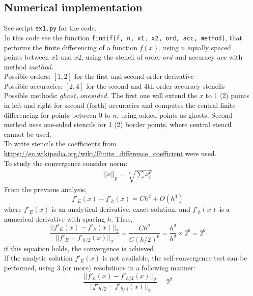 \documentclass{article}
\begin{document}
\subsection{Numerical implementation}
See script \texttt{ex1.py} for the code. \\
In this code see the function \texttt{findif(f, n, x1, x2, ord, acc, method)}, that performs the finite differencing of a function $f(x)$, using $n$ equally spaced points between $x1$ and $x2$, using the stencil of order $ord$ and accuracy $acc$ with method $method$. \\
Possible orders: $[1,2]$ for the first and second order derivative \\
Possible accuracies: $[2,4]$ for the second and 4th order accuracy stencils \\
Possible methods: $ghost$, $onesided$. The first one will extend the $x$ to 1 (2) points in left and right for second (forth) accuracies and computes the central finite differencing for points between $0$ to $n$, using added points as ghosts. Second method uses one-sided stencils for 1 (2) border points, where central stencil cannot be used. \\
To write stencils the coefficients from \url{https://en.wikipedia.org/wiki/Finite_difference_coefficient} were used. \\
%  
To study the convergence consider norm:
\begin{equation}
	\begin{aligned}
	||x||_p = \sqrt[p]{\sum x_i ^p} 
	\end{aligned}
\end{equation}
From the previous analysis, 
\begin{equation}
	f' _E(x) - f' _h(x) = Ch^2 + O(h^3)
\end{equation}
where $f' _E(x)$ is an analytical derivative, exact solution, and $f' _h(x)$ is a numerical derivative with spacing $h$.  Thus,
\begin{equation}
	\frac{||f' _E(x) - f' _h(x)||_2}{||f' _E - f' _{h/2}(x)||_2} = \frac{Ch^{\theta}}{C(h/2)^{\theta}} = \frac{h^{\theta}}{h^{\theta}}\times 2^{\theta} = 2^{\theta}
\end{equation}
if this equation holds, the convergence is achieved. \\
If the analytic solution $f' _E(x)$ is not available, the self-convergence test can be performed, using 3 (or more) resolutions in a following manner:
\begin{equation}
\frac{||f' _h(x) - f' _{h/2}(x)||_2}{||f' _{h/2} - f' _{h/4}(x)||_2} = 2^{\theta}
\end{equation}
\end{document}
